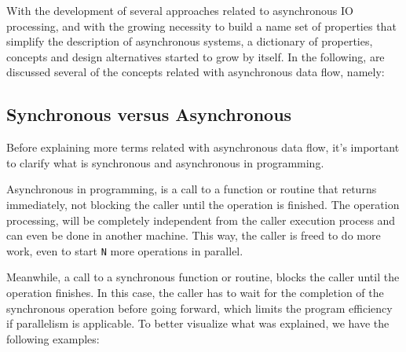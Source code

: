 With the development of several approaches related to asynchronous IO processing, and with the growing necessity to build a name set of properties that simplify the description of asynchronous systems, a dictionary
of properties, concepts and design alternatives started to grow by itself. In the following, are discussed several of the concepts related with asynchronous data flow, namely:

\subsection{Synchronous versus Asynchronous}
	Before explaining more terms related with asynchronous data flow, it's important to clarify what is synchronous and asynchronous in programming. 
	
	Asynchronous in programming, is a call to a function or routine that returns immediately, not blocking the caller until the operation is finished. The operation processing, will be completely independent from the caller execution process and can even be done in another machine. This way, the caller is freed to do more work, even to start \texttt{N} more operations in parallel. 
	
	Meanwhile, a call to a synchronous function or routine, blocks the caller until the operation finishes. In this case, the caller has to wait for the completion of the synchronous operation before going forward, which limits the program efficiency if parallelism is applicable.
	To better visualize what was explained, we have the following examples: 
	


